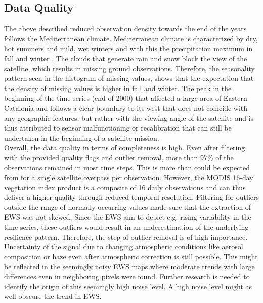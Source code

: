 \subsection{Data Quality}
The above described reduced observation density towards the end of the years follows the Mediterranean climate. Mediterranean climate is characterized by dry, hot summers and mild, wet winters and with this the precipitation maximum in fall and winter \citep{lionello2006}. The clouds that generate rain and snow block the view of the satellite, which results in missing ground observations. Therefore, the seasonality pattern seen in the histogram of missing values, shows that the expectation that the density of missing values is higher in fall and winter. The peak in the beginning of the time series (end of 2000) that affected a large area of Eastern Catalonia and follows a clear boundary to its west that does not coincide with any geographic features, but rather with the viewing angle of the satellite and is thus attributed to sensor malfunctioning or recalibration that can still be undertaken in the beginning of a satellite mission.\\
Overall, the data quality in terms of completeness is high. Even after filtering with the provided quality flags and outlier removal, more than 97\% of the observations remained in most time steps. This is more than could be expected from for a single satellite overpass per observation. However, the MODIS 16-day vegetation index product is a composite of 16 daily observations \citep{huete2002} and can thus deliver a higher quality through reduced temporal resolution. Filtering for outliers outside the range of normally occurring values made sure that the extraction of EWS was not skewed. Since the EWS aim to depict e.g. rising variability in the time series, these outliers would result in an underestimation of the underlying resilience pattern. Therefore, the step of outlier removal is of high importance. Uncertainty of the signal due to changing atmospheric conditions like aerosol composition or haze even after atmospheric correction is still possible. This might be reflected in the seemingly noisy EWS maps where moderate trends with large differences even in neighboring pixels were found. Further research is needed to identify the origin of this seemingly high noise level. A high noise level might as well obscure the trend in EWS.\\



